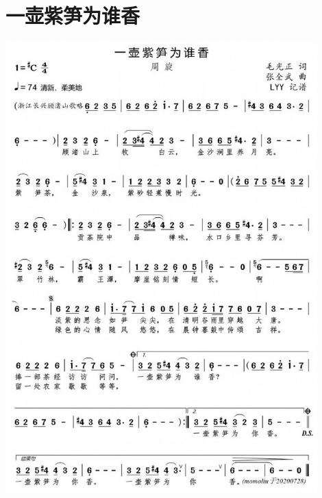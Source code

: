 \documentclass[cn,pad,twocol]{elegantbook}
\begin{document}
\section{一壶紫笋为谁香}
    \includegraphics[width=0.9\textwidth]{dongxiao/20200901-一壶紫笋为谁香.jpeg} 
\end{document}
